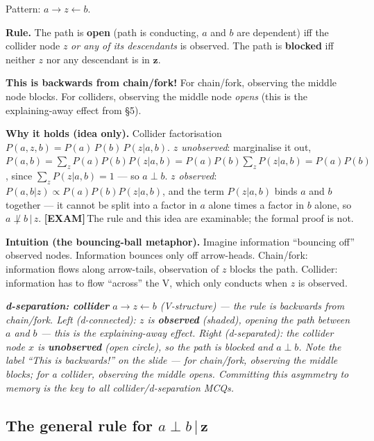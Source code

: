 \documentclass[11pt, a4paper]{article}
\newcommand{\examflag}{\textcolor{tipBd}{\textbf{[EXAM]}}\,}
\begin{document}
Pattern: $a \to z \leftarrow b$.

\textbf{Rule.} The path is \textbf{open} (path is conducting, $a$ and $b$ are dependent) iff the collider node $z$ \emph{or any of its descendants} is observed. The path is \textbf{blocked} iff neither $z$ nor any descendant is in $\mathbf{z}$.

\textbf{This is backwards from chain/fork!} For chain/fork, observing the middle node blocks. For colliders, observing the middle node \emph{opens} (this is the explaining-away effect from §5).

\textbf{Why it holds (idea only).} Collider factorisation $P(a,z,b)=P(a)\,P(b)\,P(z|a,b)$. \emph{$z$ unobserved}: marginalise it out, $P(a,b)=\sum_z P(a)P(b)P(z|a,b)=P(a)P(b)\sum_z P(z|a,b)=P(a)P(b)$, since $\sum_z P(z|a,b)=1$ — so $a\perp b$. \emph{$z$ observed}: $P(a,b|z)\propto P(a)P(b)P(z|a,b)$, and the term $P(z|a,b)$ binds $a$ and $b$ together — it cannot be split into a factor in $a$ alone times a factor in $b$ alone, so $a\not\perp b\,|\,z$. \examflag{}The rule and this idea are examinable; the formal proof is not.

\textbf{Intuition (the bouncing-ball metaphor).} Imagine information ``bouncing off'' observed nodes. Information bounces only off arrow-heads. Chain/fork: information flows along arrow-tails, observation of $z$ blocks the path. Collider: information has to flow ``across'' the V, which only conducts when $z$ is observed.

\begin{center}

\footnotesize\textit{\textbf{d-separation: collider} $a \to z \leftarrow b$ (V-structure) --- the rule is \emph{backwards} from chain/fork. \emph{Left} (d-connected): $z$ is \textbf{observed} (shaded), opening the path between $a$ and $b$ --- this is the explaining-away effect. \emph{Right} (d-separated): the collider node $x$ is \textbf{unobserved} (open circle), so the path is blocked and $a \perp b$. Note the label ``This is backwards!'' on the slide --- for chain/fork, observing the middle blocks; for a collider, observing the middle \emph{opens}. Committing this asymmetry to memory is the key to all collider/d-separation MCQs.}
\end{center}

\subsection{\texorpdfstring{The general rule for $a \perp b \,|\, \mathbf{z}$}{The general rule for a perp b given z}}
\end{document}
